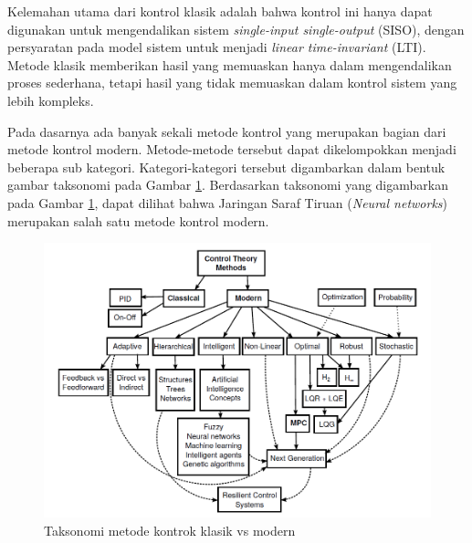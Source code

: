 Kelemahan utama dari kontrol klasik adalah bahwa kontrol ini hanya dapat digunakan untuk mengendalikan sistem \textit{single-input single-output} (SISO), dengan persyaratan pada model sistem untuk menjadi \textit{linear time-invariant} (LTI). Metode klasik memberikan hasil yang memuaskan hanya dalam mengendalikan proses sederhana, tetapi hasil yang tidak memuaskan dalam kontrol sistem yang lebih kompleks. \cite{MPCDissertation}

Pada dasarnya ada banyak sekali metode kontrol yang merupakan bagian dari metode kontrol modern. Metode-metode tersebut dapat dikelompokkan menjadi beberapa sub kategori. Kategori-kategori tersebut digambarkan dalam bentuk gambar taksonomi pada Gambar \ref{fig:3:ControlSystemTaxonomy}. Berdasarkan taksonomi yang digambarkan pada Gambar \ref{fig:3:ControlSystemTaxonomy}, dapat dilihat bahwa Jaringan Saraf Tiruan (\textit{Neural networks}) merupakan salah satu metode kontrol modern.

\begin{figure}[!h]
	\centering
	\includegraphics[width=1\textwidth]{figures/ControlSystemTaxonomy}
	\caption{Taksonomi metode kontrok klasik vs modern \cite{MPCDissertation}}
	\label{fig:3:ControlSystemTaxonomy}
\end{figure}